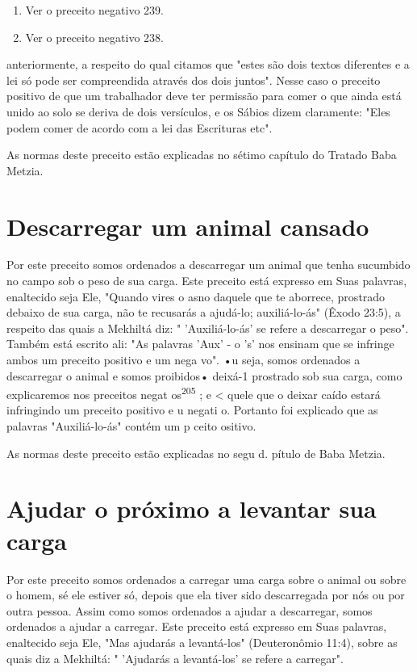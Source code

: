 \begin{enumerate}
\def\labelenumi{\arabic{enumi}.}
\setcounter{enumi}{202}
\item
 
 Ver o preceito negativo 239.
 
\item
 
 Ver o preceito negativo 238.
 
\end{enumerate}

anteriormente, a respeito do qual citamos que "estes são dois textos
diferentes e a lei só pode ser compreendida através dos dois juntos".
Nesse caso o precei­to positivo de que um trabalhador deve ter permissão
para comer o que ainda está unido ao solo se deriva de dois versículos,
e os Sábios dizem claramente: "Eles podem comer de acordo com a lei das
Escrituras etc".

As normas deste preceito estão explicadas no sétimo capítulo do Tra­tado
Baba Metzia.

\section{Descarregar um animal cansado}

Por este preceito somos ordenados a descarregar um animal que te­nha
sucumbido no campo sob o peso de sua carga. Este preceito está expresso
em Suas palavras, enaltecido seja Ele, "Quando vires o asno daquele que
te abor­rece, prostrado debaixo de sua carga, não te recusarás a
ajudá-lo; auxiliá-lo-ás" (Êxodo 23:5), a respeito das quais a Mekhiltá
diz: " 'Auxiliá-lo-ás' se refere a descarregar o peso". Também está
escrito ali: "As palavras 'Aux' - o 's' nos ensinam que se infringe
ambos um preceito positivo e um nega vo". •u seja, somos ordenados a
descarregar o animal e somos proibidos• deixá-1 pros­trado sob sua
carga, como explicaremos nos preceitos negat os\textsuperscript{205} ; e
\textless{} quele que o deixar caído estará infringindo um preceito
positivo e u negati o. Por­tanto foi explicado que as palavras
"Auxiliá-lo-ás" contém um p ceito ositivo.

As normas deste preceito estão explicadas no segu d. pítulo de Baba
Metzia.

\section{Ajudar o próximo a levantar sua carga}

Por este preceito somos ordenados a carregar uma carga sobre o ani­mal
ou sobre o homem, sé ele estiver só, depois que ela tiver sido
descarregada por nós ou por outra pessoa. Assim como somos ordenados a
ajudar a descar­regar, somos ordenados a ajudar a carregar. Este
preceito está expresso em Suas palavras, enaltecido seja Ele, "Mas
ajudarás a levantá-los" (Deuteronômio 11:4), sobre as quais diz a
Mekhiltá: " 'Ajudarás a levantá-los' se refere a carregar".

